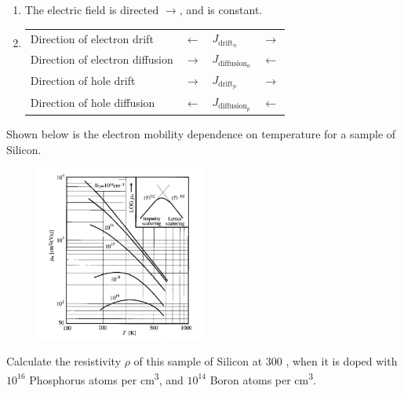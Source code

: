 \documentclass[fleqn, a4paper, 11pt, oneside]{amsart}
\theoremstyle{definition}
\theoremstyle{theorem}
\begin{document}
\begin{solution}
	\begin{enumerate}[leftmargin=*]
		\item
			The electric field is directed $\rightarrow$, and is constant.
		\item
			\begin{table}[H]
				\centering
				\begin{tabular}{l l l l}
					\toprule
					Direction of electron drift & $\leftarrow$ & $J_{\text{drift}_n}$ & $\rightarrow$\\
					Direction of electron diffusion & $\rightarrow$ & $J_{\text{diffusion}_n}$ & $\leftarrow$\\
					Direction of hole drift & $\rightarrow$ & $J_{\text{drift}_p}$ & $\rightarrow$\\
					Direction of hole diffusion & $\leftarrow$ & $J_{\text{diffusion}_p}$ & $\leftarrow$\\
					\bottomrule
				\end{tabular}
			\end{table}
	\end{enumerate}
\end{solution}

\begin{question}
	Shown below is the electron mobility dependence on temperature for a sample of Silicon.
	\begin{figure}[H]
		\centering
		\includegraphics[width = 0.5\textwidth]{fig3.png}
	\end{figure}
	Calculate the resistivity $\rho$ of this sample of Silicon at 300 \kelvin, when it is doped with $10^{16}$ Phosphorus atoms per \si{\centi\metre\cubed}, and $10^{14}$ Boron atoms per \si{\centi\metre\cubed}.
\end{question}
\end{document}
